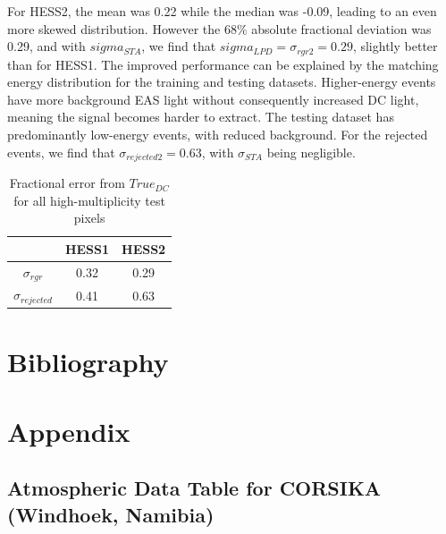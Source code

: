 \documentclass[11pt]{article}
\begin{document}
For HESS2, the mean was 0.22 while the median was -0.09, leading to an even more skewed distribution. However the 68\% absolute fractional deviation was 0.29, and with $sigma_{STA}$, we find that $sigma_{LPD}=\sigma_{rgr2}=0.29$, slightly better than for HESS1. The improved performance can be explained by the matching energy distribution for the training and testing datasets. Higher-energy events have more background EAS light without consequently increased DC light, meaning the signal becomes harder to extract. The testing dataset has predominantly low-energy events, with reduced background. For the rejected events, we find that $\sigma_{rejected2}=0.63$, with $\sigma_{STA}$ being negligible.

\begin{table}[h!]
  \centering
  \caption{Fractional error from $True_{DC}$ for all high-multiplicity test pixels}
  \label{tab:altlpderror}
  \begin{tabular}{ccc}
    \toprule
    & HESS1 & HESS2\\
    \midrule
    $\sigma_{rgr}$ & 0.32 & 0.29\\ 
    $\sigma_{rejected}$ & 0.41 & 0.63\\ 
    \bottomrule
  \end{tabular}
\end{table}
\section{Bibliography}


\section{Appendix}
\subsection{Atmospheric Data Table for CORSIKA (Windhoek, Namibia)}
\begin{center}
\begin{small}
\end{small}
\end{center}
\end{document}
